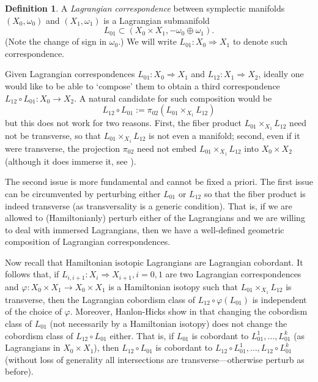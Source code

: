 \documentclass[10pt]{amsart}
\theoremstyle{definition}
\newtheorem{definition}[thm]{Definition}
\theoremstyle{remark}
\def\x{\times}
\begin{document}
\begin{definition}
    A \emph{Lagrangian correspondence} between symplectic manifolds $(X_0,\omega_0)$ and $(X_1,\omega_1)$ is a Lagrangian submanifold 
    $$
    L_{01} \subset (X_0 \x X_1, -\omega_0 \oplus \omega_1).
    $$
    (Note the change of sign in $\omega_0$.)
    We will write $L_{01}: X_0 \Rightarrow X_1$ to denote such correspondence.
\end{definition}

Given Lagrangian correspondences $L_{01}: X_0 \Rightarrow X_1$ and $L_{12}: X_1 \Rightarrow X_2$, ideally one would like to be able to `compose' them to obtain a third correspondence $L_{12} \circ L_{01}: X_0 \to X_2$. 
A natural candidate for such composition would be 
$$
    L_{12} \circ L_{01} := \pi_{02}(L_{01} \x_{X_1} L_{12})
$$
but this does not work for two reasons.
First, the fiber product $L_{01} \x_{X_1} L_{12}$ need not be transverse, so that $L_{01} \x_{X_1} L_{12}$ is not even a manifold; second, even if it were transverse, the projection $\pi_{02}$ need not embed $L_{01}\x_{X_1} L_{12}$ into $X_0 \x X_2$ (although it does immerse it, see \cite[Lemma 2.0.5]{wehrheim2010quilted}).

The second issue is more fundamental and cannot be fixed a priori.
The first issue can be circumvented by perturbing either $L_{01}$ or $L_{12}$ so that the fiber product is indeed transverse (as transversality is a generic condition).
That is, if we are allowed to (Hamiltonianly) perturb either of the Lagrangians and we are willing to deal with immersed Lagrangians, then we have a well-defined geometric composition of Lagrangian correspondences.

Now recall that Hamiltonian isotopic Lagrangians are Lagrangian cobordant. 
It follows that, if $L_{i,i+1}: X_i \Rightarrow X_{i+1}, i=0,1$ are two Lagrangian correspondences and $\varphi: X_0 \x X_1 \to X_0 \x X_1$ is a Hamiltonian isotopy such that $L_{01} \x_{X_1} L_{12}$ is transverse, then the Lagrangian cobordism class of  $L_{12} \circ \varphi(L_{01})$ is independent of the choice of $\varphi$.
Moreover, Hanlon-Hicks show in \cite[Proposition C.2]{hanlon2022aspects} that changing the cobordism class of $L_{01}$ (not necessarily by a Hamiltonian isotopy) does not change the cobordism class of $L_{12} \circ L_{01}$ either.
That is, if $L_{01}$ is cobordant to $L_{01}^1,\dots, L_{01}^k$ (as Lagrangians in $X_0 \x X_1$), then $L_{12} \circ L_{01}$ is cobordant to $L_{12} \circ L_{01}^1, \dots, L_{12} \circ L_{01}^k$ (without loss of generality all intersections are transverse---otherwise perturb as before).
\end{document}

